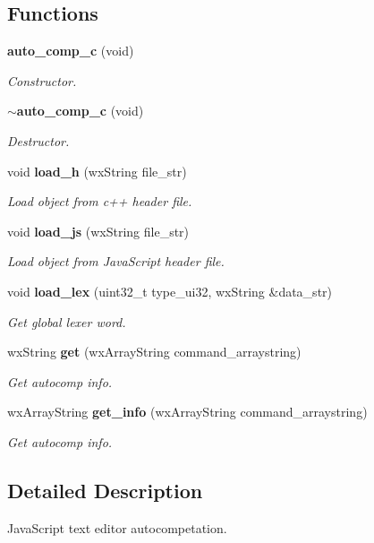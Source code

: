 \subsection*{Functions}
\begin{DoxyCompactItemize}
\item 
\textbf{ auto\+\_\+comp\+\_\+c} (void)
\begin{DoxyCompactList}\small\item\em Constructor. \end{DoxyCompactList}\item 
\textbf{ $\sim$auto\+\_\+comp\+\_\+c} (void)
\begin{DoxyCompactList}\small\item\em Destructor. \end{DoxyCompactList}\item 
void \textbf{ load\+\_\+h} (wx\+String file\+\_\+str)
\begin{DoxyCompactList}\small\item\em Load object from c++ header file. \end{DoxyCompactList}\item 
void \textbf{ load\+\_\+js} (wx\+String file\+\_\+str)
\begin{DoxyCompactList}\small\item\em Load object from Java\+Script header file. \end{DoxyCompactList}\item 
void \textbf{ load\+\_\+lex} (uint32\+\_\+t type\+\_\+ui32, wx\+String \&data\+\_\+str)
\begin{DoxyCompactList}\small\item\em Get global lexer word. \end{DoxyCompactList}\item 
wx\+String \textbf{ get} (wx\+Array\+String command\+\_\+arraystring)
\begin{DoxyCompactList}\small\item\em Get autocomp info. \end{DoxyCompactList}\item 
wx\+Array\+String \textbf{ get\+\_\+info} (wx\+Array\+String command\+\_\+arraystring)
\begin{DoxyCompactList}\small\item\em Get autocomp info. \end{DoxyCompactList}\end{DoxyCompactItemize}


\subsection{Detailed Description}
Java\+Script text editor autocompetation. 



